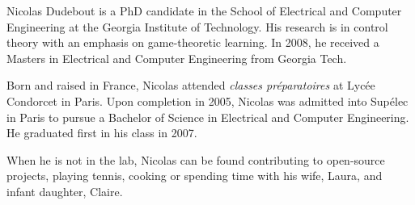 Nicolas Dudebout is a PhD candidate in the School of Electrical and Computer Engineering at the Georgia Institute of Technology.
His research is in control theory with an emphasis on game-theoretic learning.
In 2008, he received a Masters in Electrical and Computer Engineering from Georgia Tech.

Born and raised in France, Nicolas attended \emph{classes préparatoires} at Lycée Condorcet in Paris.
Upon completion in 2005, Nicolas was admitted into Supélec in Paris to pursue a Bachelor of Science in Electrical and Computer Engineering.
He graduated first in his class in 2007.

When he is not in the lab, Nicolas can be found contributing to open-source projects, playing tennis, cooking or spending time with his wife, Laura, and infant daughter, Claire.
